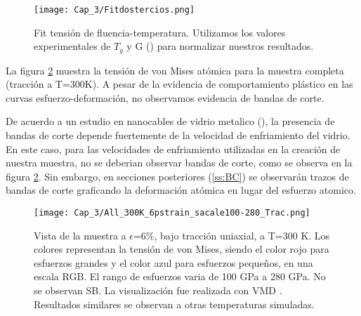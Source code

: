 \begin{figure}[htp]
\centering
\texttt{[image: Cap\_3/Fitdostercios.png]}
\caption[Fit tensión de fluencia-temperatura.]{Fit tensión de fluencia-temperatura. Utilizamos los valores experimentales de $T_g$ y G (\cite{johnson05}) para normalizar nuestros resultados.}
\label{C3:fg:fitDosTercios}
\end{figure}

La figura \ref{C3:fg:sampleTen} muestra la tensión de von Mises atómica para la muestra completa (tracción a T=300K). A pesar de la evidencia de comportamiento plástico en las curvas esfuerzo-deformación, no observamos evidencia de bandas de corte.


De acuerdo a un estudio en nanocables de vidrio metalico (\cite{xiao12}), la presencia de bandas de corte depende fuertemente de la velocidad de enfriamiento del vidrio. En este caso, para las velocidades de enfriamiento utilizadas en la creación de nuestra muestra, no se deberian observar bandas de corte, como se observa en la figura \ref{C3:fg:sampleTen}. Sin embargo, en secciones posteriores (\ref{ss:BC}) se observarán trazos de bandas de corte graficando la deformación atómica en lugar del esfuerzo atomico.


\begin{figure}[htp]
\centering
\texttt{[image: Cap\_3/All\_300K\_6pstrain\_sacale100-280\_Trac.png]}
\caption[Vista de la muestra a $\epsilon$=6\%, bajo tracción uniaxial, a T=300 K.]{Vista de la muestra a $\epsilon$=6\%, bajo tracción uniaxial, a T=300 K. Los colores representan la tensión de von Mises, siendo el color rojo para esfuerzos grandes y el color azul para esfuerzos pequeños, en una escala RGB. El rango de esfuerzos varia de 100 GPa a 280 GPa. No se observan SB. La visualización fue realizada con VMD \citep{humphrey96}. Resultados similares se observan a otras temperaturas simuladas.}
\label{C3:fg:sampleTen}
\end{figure}

